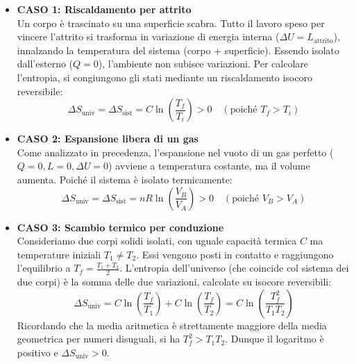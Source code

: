 \begin{itemize}
    \item \textbf{CASO 1: Riscaldamento per attrito} \\
    Un corpo è trascinato su una superficie scabra. Tutto il lavoro speso per vincere l'attrito si trasforma in variazione di energia interna ($\Delta U = L_{\text{attrito}}$), innalzando la temperatura del sistema (corpo + superficie). Essendo isolato dall'esterno ($Q = 0$), l'ambiente non subisce variazioni. Per calcolare l'entropia, si congiungono gli stati mediante un riscaldamento isocoro reversibile:
    \begin{equation}
        \Delta S_{\text{univ}} = \Delta S_{\text{sist}} = C \ln\left( \frac{T_f}{T_i} \right) > 0 \quad (\text{poiché } T_f > T_i)
    \end{equation}

    \item \textbf{CASO 2: Espansione libera di un gas} \\
    Come analizzato in precedenza, l'espansione nel vuoto di un gas perfetto ($Q=0, L=0, \Delta U=0$) avviene a temperatura costante, ma il volume aumenta. Poiché il sistema è isolato termicamente:
    \begin{equation}
        \Delta S_{\text{univ}} = \Delta S_{\text{sist}} = nR \ln\left( \frac{V_B}{V_A} \right) > 0 \quad (\text{poiché } V_B > V_A)
    \end{equation}

    \item \textbf{CASO 3: Scambio termico per conduzione} \\
    Consideriamo due corpi solidi isolati, con uguale capacità termica $C$ ma temperature iniziali $T_1 \neq T_2$. Essi vengono posti in contatto e raggiungono l'equilibrio a $T_f = \frac{T_1 + T_2}{2}$. L'entropia dell'universo (che coincide col sistema dei due corpi) è la somma delle due variazioni, calcolate su isocore reversibili:
    \begin{equation}
        \Delta S_{\text{univ}} = C \ln\left( \frac{T_f}{T_1} \right) + C \ln\left( \frac{T_f}{T_2} \right) = C \ln\left( \frac{T_f^2}{T_1 T_2} \right)
    \end{equation}
    Ricordando che la media aritmetica è strettamente maggiore della media geometrica per numeri disuguali, si ha $T_f^2 > T_1 T_2$. Dunque il logaritmo è positivo e $\Delta S_{\text{univ}} > 0$.


\end{itemize}
